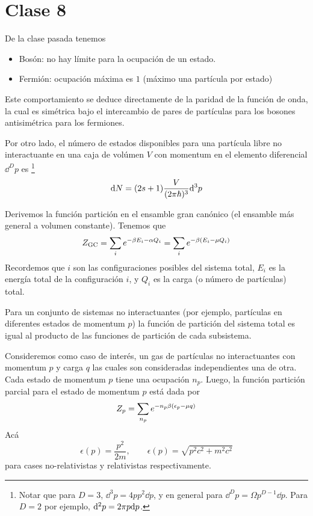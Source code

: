 \section{Clase 8}
De la clase pasada tenemos
\begin{itemize}
	\item Bosón: no hay límite para la ocupación de un estado.
	\item Fermión: ocupación máxima es $1$ (máximo una partícula por estado)
\end{itemize}
Este comportamiento se deduce directamente de la paridad de la función de onda, la cual es simétrica bajo el intercambio de pares de partículas para los bosones  antisimétrica para los fermiones. 

Por otro lado, el número de estados disponibles para una partícula libre no interactuante en una caja de volúmen $V$ con momentum en el elemento diferencial $\dd^D p$ es \footnote{Notar que para $D=3$, $\dd^3p=4p p^2\dd p$, y en general para $\dd^Dp=\Omega p^{D-1}\dd p$. Para $D=2$ por ejemplo, $\dd^2 p=2\pi p\dd p$.}
\begin{equation}
	\dd N=(2s+1)\frac{V}{(2\pi\hbar)^3}\dd^3p
\end{equation}

Derivemos la función partición en el ensamble gran canónico (el ensamble más general a volumen constante). Tenemos que
\begin{equation}
  Z_{\rm GC}=\sum_i e^{-\beta E_i-\alpha Q_i}=\sum_i e^{-\beta(E_i-\mu Q_i)}
\end{equation}
Recordemos que $i$ son las configuraciones posibles del sistema total, $E_i$ es la energía total de la configuración $i$, y $Q_i$ es la carga (o número de partículas) total.

Para un conjunto de sistemas no interactuantes (por ejemplo, partículas en diferentes estados de momentum $p$) la función de partición del sistema total es igual al producto de las funciones de partición de cada subsistema.

Consideremos como caso de interés, un gas de partículas no interactuantes con momentum $p$ y carga $q$ las cuales son consideradas independientes una de otra. Cada estado de momentum $p$ tiene una ocupación $n_p$. Luego, la función partición parcial para el estado de momentum $p$ está dada por
\begin{equation}
  Z_{p}=\sum_{n_p}e^{-n_p\beta (\epsilon	_p-\mu q)}
\end{equation}
Acá 
\begin{equation}
  \epsilon(p)=\frac{p^2}{2m},\qquad \epsilon(p)=\sqrt{p^2c^2+m^2c^2}
\end{equation}
para cases no-relativistas y relativistas respectivamente.

